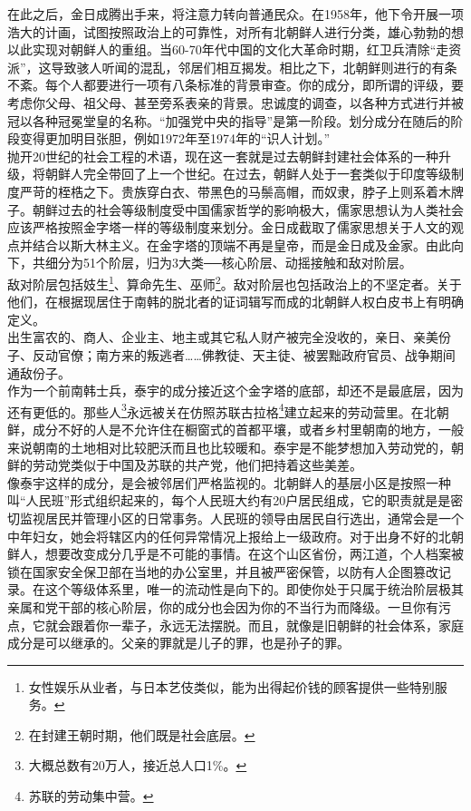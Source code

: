 在此之后，金日成腾出手来，将注意力转向普通民众。在1958年，他下令开展一项浩大的计画，试图按照政治上的可靠性，对所有北朝鲜人进行分类，雄心勃勃的想以此实现对朝鲜人的重组。当60-70年代中国的文化大革命时期，红卫兵清除“走资派”，这导致骇人听闻的混乱，邻居们相互揭发。相比之下，北朝鲜则进行的有条不紊。每个人都要进行一项有八条标准的背景审查。你的成分，即所谓的评级，要考虑你父母、祖父母、甚至旁系表亲的背景。忠诚度的调查，以各种方式进行并被冠以各种冠冕堂皇的名称。“加强党中央的指导”是第一阶段。划分成分在随后的阶段变得更加明目张胆，例如1972年至1974年的“识人计划。”\\

抛开20世纪的社会工程的术语，现在这一套就是过去朝鲜封建社会体系的一种升级，将朝鲜人完全带回了上一个世纪。在过去，朝鲜人处于一套类似于印度等级制度严苛的桎梏之下。贵族穿白衣、带黑色的马鬃高帽，而奴隶，脖子上则系着木牌子。朝鲜过去的社会等级制度受中国儒家哲学的影响极大，儒家思想认为人类社会应该严格按照金字塔一样的等级制度来划分。金日成截取了儒家思想关于人文的观点并结合以斯大林主义。在金字塔的顶端不再是皇帝，而是金日成及金家。由此向下，共细分为51个阶层，归为3大类──核心阶层、动摇接触和敌对阶层。\\

敌对阶层包括妓生\footnote{女性娱乐从业者，与日本艺伎类似，能为出得起价钱的顾客提供一些特别服务。}、算命先生、巫师\footnote{在封建王朝时期，他们既是社会底层。}。敌对阶层也包括政治上的不坚定者。关于他们，在根据现居住于南韩的脱北者的证词辑写而成的北朝鲜人权白皮书上有明确定义。\\

出生富农的、商人、企业主、地主或其它私人财产被完全没收的，亲日、亲美份子、反动官僚；南方来的叛逃者……佛教徒、天主徒、被罢黜政府官员、战争期间通敌份子。\\

作为一个前南韩士兵，泰宇的成分接近这个金字塔的底部，却还不是最底层，因为还有更低的。那些人\footnote{大概总数有20万人，接近总人口1\%。}永远被关在仿照苏联古拉格\footnote{苏联的劳动集中营。}建立起来的劳动营里。在北朝鲜，成分不好的人是不允许住在橱窗式的首都平壤，或者乡村里朝南的地方，一般来说朝南的土地相对比较肥沃而且也比较暖和。泰宇是不能梦想加入劳动党的，朝鲜的劳动党类似于中国及苏联的共产党，他们把持着这些美差。\\

像泰宇这样的成分，是会被邻居们严格监视的。北朝鲜人的基层小区是按照一种叫“人民班”形式组织起来的，每个人民班大约有20户居民组成，它的职责就是是密切监视居民并管理小区的日常事务。人民班的领导由居民自行选出，通常会是一个中年妇女，她会将辖区内的任何异常情况上报给上一级政府。对于出身不好的北朝鲜人，想要改变成分几乎是不可能的事情。在这个山区省份，两江道，个人档案被锁在国家安全保卫部在当地的办公室里，并且被严密保管，以防有人企图篡改记录。在这个等级体系里，唯一的流动性是向下的。即使你处于只属于统治阶层极其亲属和党干部的核心阶层，你的成分也会因为你的不当行为而降级。一旦你有污点，它就会跟着你一辈子，永远无法摆脱。而且，就像是旧朝鲜的社会体系，家庭成分是可以继承的。父亲的罪就是儿子的罪，也是孙子的罪。\\

